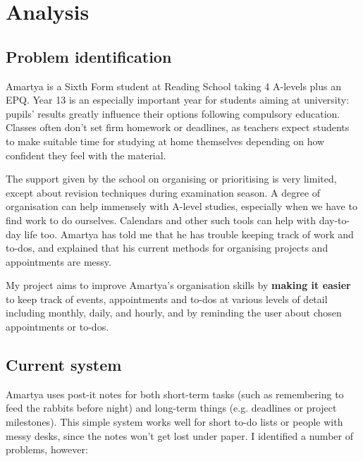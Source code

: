 \section{Analysis}

\subsection{Problem identification}

Amartya is a Sixth Form student at Reading School taking 4 A-levels plus an EPQ.
Year 13 is an especially important year for students aiming at university:
pupils' results greatly influence their options following compulsory education.
Classes often don't set firm homework or deadlines, as teachers expect students
to make suitable time for studying at home themselves depending on how confident
they feel with the material.

The support given by the school on organising or prioritising is very limited,
except about revision techniques during examination season. A degree of
organisation can help immensely with A-level studies, especially when we have to
find work to do ourselves. Calendars and other such tools can help with
day-to-day life too. Amartya has told me that he has trouble keeping track of
work and to-dos, and explained that his current methods for organising projects
and appointments are messy.

My project aims to improve Amartya's organisation skills by \textbf{making it
easier} to keep track of events, appointments and to-dos at various levels of
detail including monthly, daily, and hourly, and by reminding the user about
chosen appointments or to-dos.


\subsection{Current system}

Amartya uses post-it notes for both short-term tasks (such as remembering to
feed the rabbits before night) and long-term things (e.g. deadlines or project
milestones). This simple system works well for short to-do lists or people with
messy desks, since the notes won't get lost under paper. I identified a number
of problems, however:

